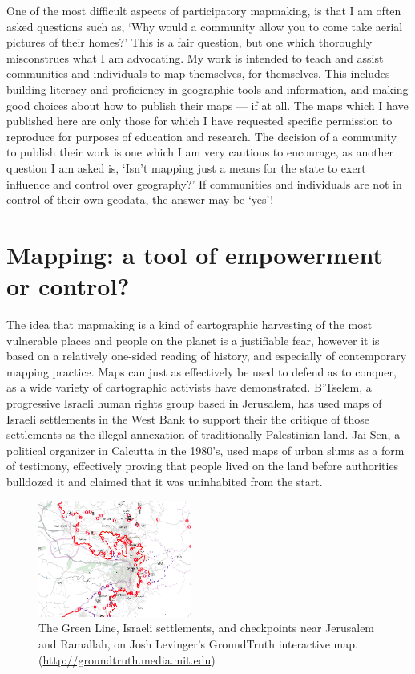 \documentclass[11pt,oneside,notitlepage]{report}
\begin{document}
{{One of the most difficult aspects of participatory mapmaking, is that I am often asked questions such as, `Why would a community allow you to come take aerial pictures of their homes?' This is a fair question, but one which thoroughly misconstrues what I am advocating. My work is intended to teach and assist communities and individuals to map themselves, for themselves. This includes building literacy and proficiency in geographic tools and information, and making good choices about how to publish their maps --- if at all. The maps which I have published here are only those for which I have requested specific permission to reproduce for purposes of education and research. The decision of a community to publish their work is one which I am very cautious to encourage, as another question I am asked is, `Isn't mapping just a means for the state to exert influence and control over geography?' If communities and individuals are not in control of their own geodata, the answer may be `yes'! 

\section{Mapping: a tool of empowerment or control?}
\label{subsec:empowerment}

The idea that mapmaking is a kind of cartographic harvesting of the most vulnerable places and people on the planet is a justifiable fear, however it is based on a relatively one-sided reading of history, and especially of contemporary mapping practice. Maps can just as effectively be used to defend as to conquer, as a wide variety of cartographic activists have demonstrated. B'Tselem, a progressive Israeli human rights group based in Jerusalem, has used maps of Israeli settlements in the West Bank to support their the critique of those settlements as the illegal annexation of traditionally Palestinian land. Jai Sen, a political organizer in Calcutta in the 1980's, used maps of urban slums as a form of testimony, effectively proving that people lived on the land before authorities bulldozed it and claimed that it was uninhabited from the start. 

\begin{figure}
	\begin{flushright}
		\includegraphics[width=0.45\textwidth]{images/levinger-groundtruth.png}
		\caption{The Green Line, Israeli settlements, and checkpoints near Jerusalem and Ramallah, on Josh Levinger's GroundTruth interactive map. (\url{http://groundtruth.media.mit.edu})}
	\end{flushright}
\end{figure}

}}
\end{document}
